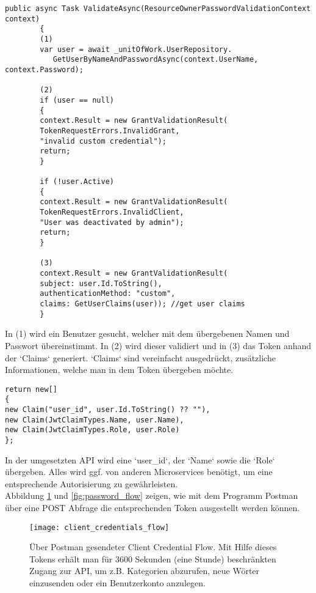 \begin{verbatim}
public async Task ValidateAsync(ResourceOwnerPasswordValidationContext context)
		{
		(1)
		var user = await _unitOfWork.UserRepository.
           GetUserByNameAndPasswordAsync(context.UserName, context.Password);
		
		(2)
		if (user == null)
		{
		context.Result = new GrantValidationResult(
		TokenRequestErrors.InvalidGrant,
		"invalid custom credential");
		return;
		}
		
		if (!user.Active)
		{
		context.Result = new GrantValidationResult(
		TokenRequestErrors.InvalidClient,
		"User was deactivated by admin");
		return;
		}
		
		(3)
		context.Result = new GrantValidationResult(
		subject: user.Id.ToString(),
		authenticationMethod: "custom",
		claims: GetUserClaims(user)); //get user claims
		}
\end{verbatim}

In (1) wird ein Benutzer gesucht, welcher mit dem übergebenen Namen und Passwort übereinstimmt. In (2) wird dieser validiert und in (3) das Token anhand der `Claims` generiert. `Claims` sind vereinfacht ausgedrückt, zusätzliche Informationen, welche man in dem Token übergeben möchte. 

\begin{verbatim}
return new[]
{
new Claim("user_id", user.Id.ToString() ?? ""),
new Claim(JwtClaimTypes.Name, user.Name),
new Claim(JwtClaimTypes.Role, user.Role)
};
\end{verbatim}

In der umgesetzten API wird eine `user\_id`, der `Name` sowie die `Role` übergeben. Alles wird ggf. von anderen Microservices benötigt, um eine entsprechende Autorisierung zu gewährleisten.\\

Abbildung \ref{fig:client_credentials_flow} und \ref{fig:password_flow} zeigen, wie mit dem Programm Postman über eine POST Abfrage die entsprechenden Token ausgestellt werden können.\\

\begin{figure}[ht]
	\centering
	\texttt{[image: client\_credentials\_flow]}
	\caption[Über Postman gesendeter Client Credential Flow] {Über Postman gesendeter Client Credential Flow. Mit Hilfe dieses Tokens erhält man für 3600 Sekunden (eine Stunde) beschränkten Zugang zur API, um  z.B. Kategorien abzurufen, neue Wörter einzusenden oder ein Benutzerkonto anzulegen.}
	\label{fig:client_credentials_flow}
\end{figure} 

